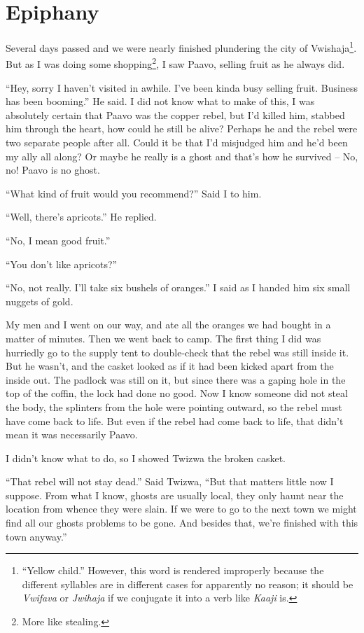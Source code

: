 \chapter{Epiphany}

Several days passed and we were nearly finished plundering the city of Vwishaja\footnote{``Yellow child.'' However, this word is rendered improperly because the different syllables are in different cases for apparently no reason; it should be \emph{Vwifava} or \emph{Jwihaja} if we conjugate it into a verb like \emph{Kaaji} is.}. But as I was doing some shopping\footnote{More like stealing.}, I saw Paavo, selling fruit as he always did.

``Hey, sorry I haven't visited in awhile. I've been kinda busy selling fruit. Business has been booming.'' He said. I did not know what to make of this, I was absolutely certain that Paavo was the copper rebel, but I'd killed him, stabbed him through the heart, how could he still be alive?
Perhaps he and the rebel were two separate people after all.
Could it be that I'd misjudged him and he'd been my ally all along?
Or maybe he really is a ghost and that's how he survived -- No, no! Paavo is no ghost.

``What kind of fruit would you recommend?'' Said I to him.

``Well, there's apricots.'' He replied.

``No, I mean good fruit.''

``You don't like apricots?''

``No, not really. I'll take six bushels of oranges.'' I said as I handed him six small nuggets of gold.

My men and I went on our way, and ate all the oranges we had bought in a matter of minutes. Then we went back to camp. The first thing I did was hurriedly go to the supply tent to double-check that the rebel was still inside it. But he wasn't, and the casket looked as if it had been kicked apart from the inside out. The padlock was still on it, but since there was a gaping hole in the top of the coffin, the lock had done no good. Now I know someone did not steal the body, the splinters from the hole were pointing outward, so the rebel must have come back to life. But even if the rebel had come back to life, that didn't mean it was necessarily Paavo.

I didn't know what to do, so I showed Twizwa the broken casket.

``That rebel will not stay dead.'' Said Twizwa, ``But that matters little now I suppose. From what I know, ghosts are usually local, they only haunt near the location from whence they were slain. If we were to go to the next town we might find all our ghosts problems to be gone. And besides that, we're finished with this town anyway.''

